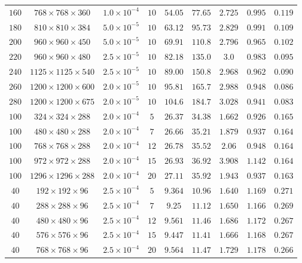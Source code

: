 \begin{table}
\begin{center}
\begin{tabular}{c c c c c c c c c}
$160$ & $768\times768\times360$ & $1.0\times 10^{-4}$ & $10$ & $54.05$ & $77.65$ & $2.725$ & $0.995$&$0.119$\\
$180$ & $810\times810\times384$ & $5.0\times 10^{-5}$ & $10$ & $63.12$ & $95.73$ & $2.829$ & $0.991$&$0.109$\\
$200$ & $960\times960\times450$ & $5.0\times 10^{-5}$ & $10$ & $69.91$ & $110.8$ & $2.796$ & $0.965$&$0.102$\\
$220$ & $960\times960\times480$ & $2.5\times 10^{-5}$ & $10$ & $82.18$ & $135.0$ & $3.0$ & $0.983$&$0.095$\\
$240$ & $1125\times1125\times540$ & $2.5\times 10^{-5}$ & $10$ & $89.00$ & $150.8$ & $2.968$ & $0.962$&$0.090$\\
$260$ & $1200\times1200\times600$ & $2.0\times 10^{-5}$ & $10$ & $95.81$ & $165.7$ & $2.988$ & $0.948$&$0.086$\\
$280$ & $1200\times1200\times675$ & $2.0\times 10^{-5}$ & $10$ & $104.6$ & $184.7$ & $3.028$ & $0.941$&$0.083$\\
$100$ & $324\times324\times288$ & $2.0\times 10^{-4}$ & $5$ & $26.37$ & $34.38$ & $1.662$ & $0.926$&$0.165$\\
$100$ & $480\times480\times288$ & $2.0\times 10^{-4}$ & $7$ & $26.66$ & $35.21$ & $1.879$ & $0.937$&$0.164$\\
$100$ & $768\times768\times288$ & $2.0\times 10^{-4}$ & $12$ & $26.78$ & $35.52$ & $2.06$ & $0.948$&$0.164$\\
$100$ & $972\times972\times288$ & $2.0\times 10^{-4}$ & $15$ & $26.93$ & $36.92$ & $3.908$ & $1.142$&$0.164$\\
$100$ & $1296\times1296\times288$ & $2.0\times 10^{-4}$ & $20$ & $27.11$ & $35.92$ & $1.943$ & $0.937$&$0.163$\\
$40$ & $192\times192\times96$ & $2.5\times 10^{-4}$ & $5$ & $9.364$ & $10.96$ & $1.640$ & $1.169$&$0.271$\\
$40$ & $288\times288\times96$ & $2.5\times 10^{-4}$ & $7$ & $9.25$ & $11.12$ & $1.650$ & $1.166$&$0.269$\\
$40$ & $480\times480\times96$ & $2.5\times 10^{-4}$ & $12$ & $9.561$ & $11.46$ & $1.686$ & $1.172$&$0.267$\\
$40$ & $576\times576\times96$ & $2.5\times 10^{-4}$ & $15$ & $9.447$ & $11.41$ & $1.666$ & $1.168$&$0.267$\\
$40$ & $768\times768\times96$ & $2.5\times 10^{-4}$ & $20$ & $9.564$ & $11.47$ & $1.729$ & $1.178$&$0.266$\\
\hline
\hline
	\end{tabular}

\end{center}
\end{table}
